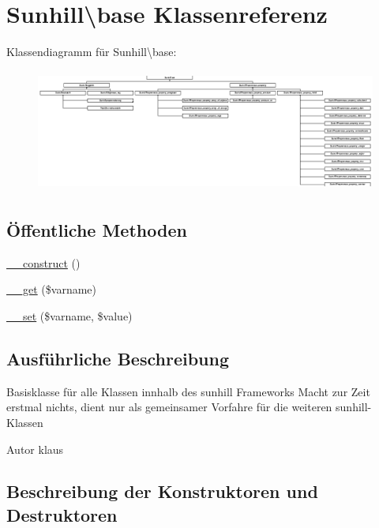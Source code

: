 \hypertarget{classSunhill_1_1base}{}\section{Sunhill\textbackslash{}base Klassenreferenz}
\label{classSunhill_1_1base}
Klassendiagramm für Sunhill\textbackslash{}base\+:\begin{figure}[H]
\begin{center}
\leavevmode
\includegraphics[height=4.054054cm]{db/d06/classSunhill_1_1base}
\end{center}
\end{figure}
\subsection*{Öffentliche Methoden}
\begin{DoxyCompactItemize}
\item 
\hyperlink{classSunhill_1_1base_a0246b8c89ff3e803c7af0909247d8193}{\+\_\+\+\_\+construct} ()
\item 
\hyperlink{classSunhill_1_1base_a03423cf6a73a895dac51e5b2f55e3e97}{\+\_\+\+\_\+get} (\$varname)
\item 
\hyperlink{classSunhill_1_1base_a0a4c979226b7cefcb7f6687fbd25c1ee}{\+\_\+\+\_\+set} (\$varname, \$value)
\end{DoxyCompactItemize}


\subsection{Ausführliche Beschreibung}
Basisklasse für alle Klassen innhalb des sunhill Frameworks Macht zur Zeit erstmal nichts, dient nur als gemeinsamer Vorfahre für die weiteren sunhill-\/\+Klassen \begin{DoxyAuthor}{Autor}
klaus 
\end{DoxyAuthor}


\subsection{Beschreibung der Konstruktoren und Destruktoren}
\mbox{\label{classSunhill_1_1base_a0246b8c89ff3e803c7af0909247d8193}} 
